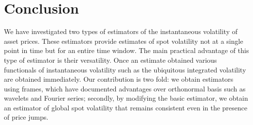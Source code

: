 \section{Conclusion}
We have investigated two types of estimators of the instantaneous volatility of asset prices. These estimators provide estimates of spot volatility not at a single point in time but for an  entire time window. The main practical advantage of this type of estimator is their versatility. Once an estimate obtained various functionals of instantaneous volatility such as the ubiquitous integrated volatility are obtained immediately. Our contribution is two fold: we obtain estimators using frames, which have documented advantages over orthonormal basis such as wavelets and Fourier series; secondly, by modifying  the basic estimator, we obtain an estimator of global spot volatility  that remains consistent even in the presence of price jumps.   
